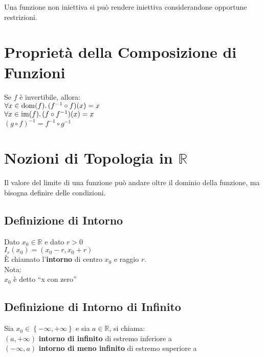 \documentclass[a4paper, twoside, italian, 11pt]{book}
\newcommand{\braces}[1] {\left \{ #1 \right \}}
\DeclareMathOperator{\dom}{dom}
\DeclareMathOperator{\im}{im}
\newcommand{\R}{\mathbb{R}}
\begin{document}
\noindent
Una funzione non iniettiva si può rendere iniettiva considerandone opportune restrizioni. %



\section{Proprietà della Composizione di Funzioni}

\noindent
Se $f$ è invertibile, allora: \\

$\forall x \in \dom(f)\ldotp (f^{-1} \circ f)(x) = x$ \\
\indent
$\forall x \in \im(f)\ldotp (f \circ f^{-1})(x) = x$ \\
\indent
$(g \circ f)^{-1} = f^{-1} \circ g^{-1}$



\section{Nozioni di Topologia in $\R$}

\noindent
Il valore del limite di una funzione può andare oltre il dominio della funzione, ma bisogna definire delle condizioni.


\subsection{Definizione di Intorno}

\noindent
Dato $x_0 \in \R$ e dato $r > 0$ \\

$I_r(x_0) = (x_0 - r, x_0 + r)$ \\

\noindent
È chiamato l'\textbf{intorno} di centro $x_0$ e raggio $r$. \\

\noindent
Nota: \\
$x_0$ è detto ``x con zero''

\subsection{Definizione di Intorno di Infinito}

\noindent
Sia $x_0 \in \braces{-\infty, +\infty}$ e sia $a \in \R$, si chiama: \\

$(a, +\infty)$ \textbf{intorno di infinito} di estremo inferiore a \\
\indent
$(-\infty, a)$ \textbf{intorno di meno infinito} di estremo superiore a
\end{document}
